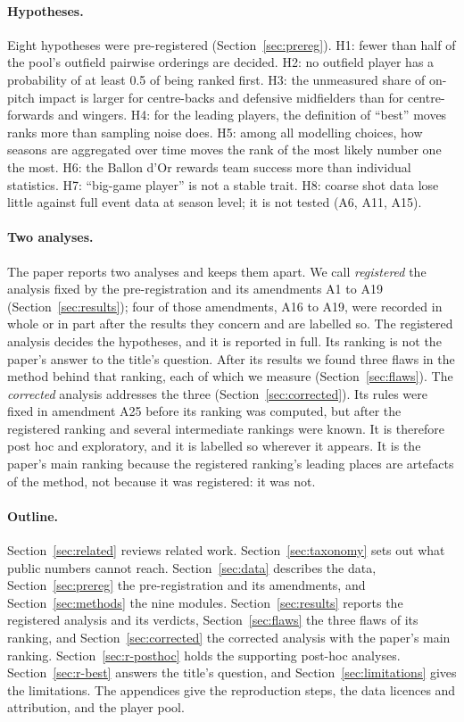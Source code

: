 \documentclass[11pt,a4paper]{article}
\begin{document}
\paragraph{Hypotheses.}
Eight hypotheses were pre-registered (Section~\ref{sec:prereg}).
H1: fewer than half of the pool's outfield pairwise orderings are decided.
H2: no outfield player has a probability of at least 0.5 of being ranked first.
H3: the unmeasured share of on-pitch impact is larger for centre-backs and
defensive midfielders than for centre-forwards and wingers.
H4: for the leading players, the definition of ``best'' moves ranks more than
sampling noise does.
H5: among all modelling choices, how seasons are aggregated over time moves
the rank of the most likely number one the most.
H6: the Ballon d'Or rewards team success more than individual statistics.
H7: ``big-game player'' is not a stable trait.
H8: coarse shot data lose little against full event data at season level;
it is not tested (A6, A11, A15).

\paragraph{Two analyses.}
The paper reports two analyses and keeps them apart. We call \emph{registered}
the analysis fixed by the pre-registration and its amendments A1 to A19
(Section~\ref{sec:results}); four of those amendments, A16 to A19, were
recorded in whole or in part after the results they concern and are labelled
so. The registered analysis decides the
hypotheses, and it is reported in full. Its ranking is not the paper's answer
to the title's question. After its results we found three flaws in the method
behind that ranking, each of which we measure (Section~\ref{sec:flaws}). The
\emph{corrected} analysis addresses the three (Section~\ref{sec:corrected}).
Its rules were fixed in amendment A25 before its ranking was computed, but
after the registered ranking and several intermediate rankings were known. It
is therefore post hoc and exploratory, and it is labelled so wherever it
appears. It is the paper's main ranking because the registered ranking's
leading places are artefacts of the method, not because it was registered:
it was not.

\paragraph{Outline.}
Section~\ref{sec:related} reviews related work.
Section~\ref{sec:taxonomy} sets out what public numbers cannot reach.
Section~\ref{sec:data} describes the data, Section~\ref{sec:prereg} the
pre-registration and its amendments, and Section~\ref{sec:methods} the nine
modules. Section~\ref{sec:results} reports the registered analysis and its
verdicts, Section~\ref{sec:flaws} the three flaws of its ranking, and
Section~\ref{sec:corrected} the corrected analysis with the paper's main
ranking. Section~\ref{sec:r-posthoc} holds the supporting post-hoc analyses.
Section~\ref{sec:r-best} answers the title's question, and
Section~\ref{sec:limitations} gives the limitations. The appendices give the
reproduction steps, the data licences and attribution, and the player pool.
\end{document}
